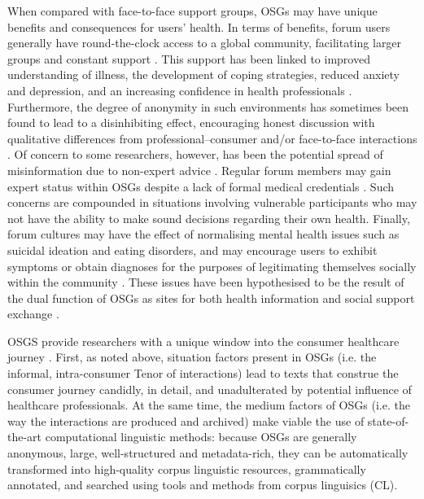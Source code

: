 \documentclass{article}
\renewcommand{\cite}{\parencite}
\begin{document}
When compared with face-to-face support groups, OSGs may have unique benefits and consequences for users' health. In terms of benefits, forum users generally have round-the-clock access to a global community, facilitating larger groups and constant support \cite{stommel_online_2010,stommel_use_2011}. This support has been linked to improved understanding of illness, the development of coping strategies, reduced anxiety and depression, and an increasing confidence in health professionals \cite{mulveen_interpretative_2006,swan_sharing_2010,manchaiah_use_2013,yao_impact_2015}. Furthermore, the degree of anonymity in such environments has sometimes been found to lead to a disinhibiting effect, encouraging honest discussion \cite{mo_are_2013} with qualitative differences from professional--consumer and\slash or face-to-face interactions \cite{maclean_forum77:_2015}. Of concern to some researchers, however, has been the potential spread of misinformation due to non-expert advice \cite{ziebland_how_2004}. Regular forum members may gain expert status within OSGs despite a lack of formal medical credentials \cite{hardey_doctor_1999,thompson_credibility_2012}. Such concerns are compounded in situations involving vulnerable participants who may not have the ability to make sound decisions regarding their own health. Finally, forum cultures may have the effect of normalising mental health issues such as suicidal ideation and eating disorders, and may encourage users to exhibit symptoms or obtain diagnoses for the purposes of legitimating themselves socially within the community \cite{horne_doing_2009,vayreda_social_2009}. These issues have been hypothesised to be the result of the dual function of OSGs as sites for both health information and social support exchange \cite{nambisan_information_2011,attard_thematic_2012}.

OSGS provide researchers with a unique window into the consumer healthcare journey \cite{harvey_disclosures_2012}. First, as noted above, situation factors present in OSGs (i.e. the informal, intra-consumer Tenor of interactions) lead to texts that construe the consumer journey candidly, in detail, and unadulterated by potential influence of healthcare professionals. At the same time, the medium factors of OSGs (i.e. the way the interactions are produced and archived) make viable the use of state-of-the-art computational linguistic methods: because OSGs are generally anonymous, large, well-structured and metadata-rich, they can be automatically transformed into high-quality corpus linguistic resources, grammatically annotated, and searched using tools and methods from corpus linguisics (CL). 
\end{document}
